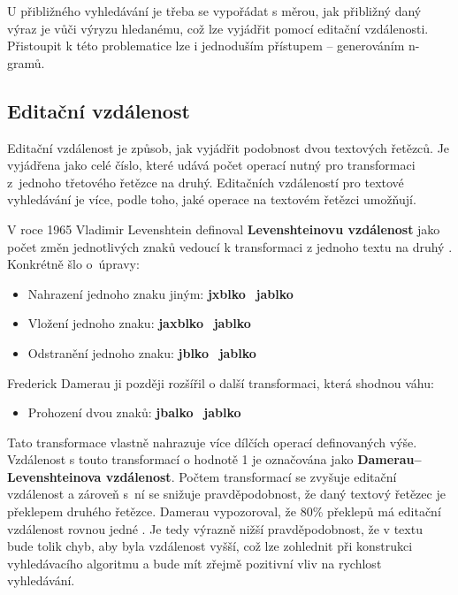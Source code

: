 \documentclass[FM,DP]{tulthesis}
\begin{document}
U přibližného vyhledávání je třeba se vypořádat s měrou, jak přibližný daný výraz
je vůči výryzu hledanému, což lze vyjádřit pomocí editační vzdálenosti. Přistoupit
k této problematice lze i jednoduším přístupem -- generováním n-gramů.

\subsection{Editační vzdálenost}

Editační vzdálenost je způsob, jak vyjádřit podobnost dvou textových řetězců. Je
vyjádřena jako celé číslo, které udává počet operací nutný pro transformaci z~jednoho
třetového řetězce na druhý. Editačních vzdáleností pro textové vyhledávání je více, 
podle toho, jaké operace na textovém řetězci umožňují.

V roce 1965 Vladimir Levenshtein definoval \textbf{Levenshteinovu vzdálenost} jako počet
změn jednotlivých znaků vedoucí k transformaci z jednoho textu na druhý \cite{es-fuzziness}. 
Konkrétně šlo o~úpravy:

\begin{itemize}
\item Nahrazení jednoho znaku jiným: \textbf{jxblko} \textrightarrow ~\textbf{jablko}
\item Vložení jednoho znaku: \textbf{jaxblko} \textrightarrow ~\textbf{jablko}
\item Odstranění jednoho znaku: \textbf{jblko} \textrightarrow ~\textbf{jablko}
\end{itemize}

Frederick Damerau ji později rozšířil o další transformaci, která shodnou váhu:

\begin{itemize}
\item Prohození dvou znaků: \textbf{jbalko} \textrightarrow ~\textbf{jablko}
\end{itemize}

Tato transformace vlastně nahrazuje více dílčích operací definovaných výše. 
Vzdálenost s touto transformací o hodnotě 1 je označována jako 
\textbf{Damerau–Levenshteinova vzdálenost}. 
Počtem transformací se zvyšuje editační vzdálenost a zároveň
s~ní se snižuje pravděpodobnost, že daný textový řetězec je překlepem
druhého řetězce. Damerau vypozoroval, že 80\% překlepů má editační vzdálenost 
rovnou jedné \cite{damerau}. Je tedy výrazně nižší pravděpodobnost, že 
v textu bude tolik chyb, aby byla vzdálenost vyšší, což lze zohlednit při konstrukci
vyhledávacího algoritmu a bude mít zřejmě pozitivní vliv na rychlost vyhledávání.
\end{document}
